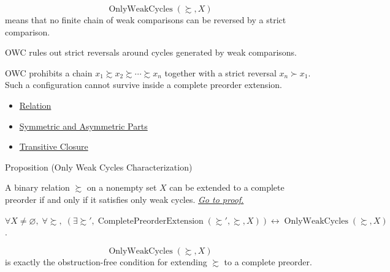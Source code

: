 \begin{remark*}
\[
  \operatorname{OnlyWeakCycles}(\succsim,X)
\] means that no finite chain of weak
comparisons can be reversed by a strict comparison.
\end{remark*}

\begin{remark*}[Interpretation]
OWC rules out strict reversals around cycles generated by weak comparisons.
\end{remark*}

\begin{remark*}[Exposition]
OWC prohibits a chain
$x_1 \succsim x_2 \succsim \cdots \succsim x_n$ together with a strict
reversal $x_n\succ x_1$. Such a configuration cannot survive inside a complete
preorder extension.
\end{remark*}

\begin{dependencies}
\begin{itemize}
  \item \hyperref[def:relation]{Relation}
  \item \hyperref[def:sym-asym]{Symmetric and Asymmetric Parts}
  \item \hyperref[def:relation-transitive-closure]{Transitive Closure}
\end{itemize}
\end{dependencies}

\begin{propositionbox}{Proposition (Only Weak Cycles Characterization)}
\begin{proposition}\label{prop:owc-characterization}
A binary relation $\succsim$ on a nonempty set $X$ can be extended to a
complete preorder if and only if it satisfies only weak cycles.
\hyperref[prf:owc-characterization]{\textit{Go to proof.}}
\end{proposition}
\end{propositionbox}

\begin{remark*}
$\forall X\neq\varnothing,\;\forall \succsim,\;
(\exists \succsim',\operatorname{CompletePreorderExtension}(\succsim',\succsim,X))
\leftrightarrow \operatorname{OnlyWeakCycles}(\succsim,X)$.
\end{remark*}

\begin{remark*}
\[
  \operatorname{OnlyWeakCycles}(\succsim,X)
\] is exactly the obstruction-free
condition for extending $\succsim$ to a complete preorder.
\end{remark*}

